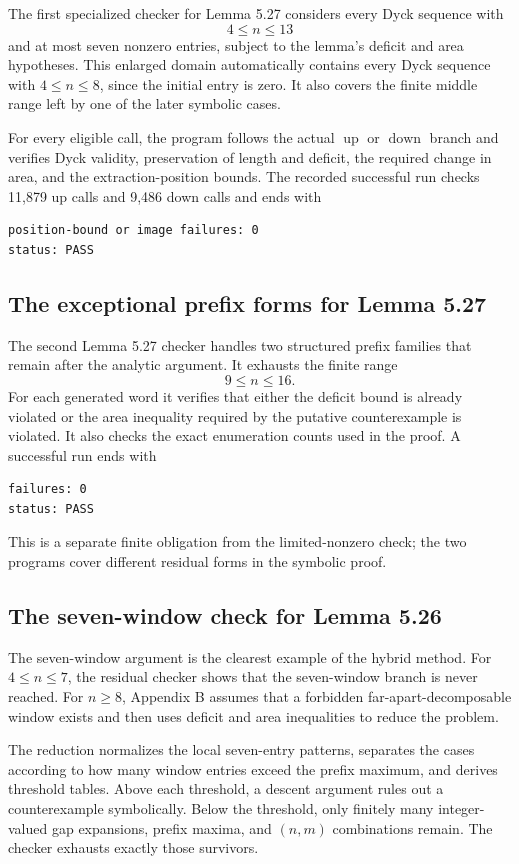 \documentclass{article}
\newcommand{\upmap}{\operatorname{up}}
\newcommand{\downmap}{\operatorname{down}}
\begin{document}
The first specialized checker for Lemma 5.27 considers every Dyck sequence
with
\[
  4\leq n\leq13
\]
and at most seven nonzero entries, subject to the lemma's deficit and area
hypotheses.  This enlarged domain automatically contains every Dyck sequence
with $4\leq n\leq8$, since the initial entry is zero.  It also covers the
finite middle range left by one of the later symbolic cases.

For every eligible call, the program follows the actual $\upmap$ or
$\downmap$ branch and verifies Dyck validity, preservation of length and
deficit, the required change in area, and the extraction-position bounds.  The
recorded successful run checks 11,879 up calls and 9,486 down calls and ends
with
\begin{verbatim}
position-bound or image failures: 0
status: PASS
\end{verbatim}

\subsection{The exceptional prefix forms for Lemma 5.27}

The second Lemma 5.27 checker handles two structured prefix families that
remain after the analytic argument.  It exhausts the finite range
\[
  9\leq n\leq16.
\]
For each generated word it verifies that either the deficit bound is already
violated or the area inequality required by the putative counterexample is
violated.  It also checks the exact enumeration counts used in the proof.  A
successful run ends with
\begin{verbatim}
failures: 0
status: PASS
\end{verbatim}
This is a separate finite obligation from the limited-nonzero check; the two
programs cover different residual forms in the symbolic proof.

\subsection{The seven-window check for Lemma 5.26}

The seven-window argument is the clearest example of the hybrid method.  For
$4\leq n\leq7$, the residual checker shows that the seven-window branch is
never reached.  For $n\geq8$, Appendix B assumes that a forbidden
far-apart-decomposable window exists and then uses deficit and area inequalities
to reduce the problem.

The reduction normalizes the local seven-entry patterns, separates the cases
according to how many window entries exceed the prefix maximum, and derives
threshold tables.  Above each threshold, a descent argument rules out a
counterexample symbolically.  Below the threshold, only finitely many
integer-valued gap expansions, prefix maxima, and $(n,m)$ combinations remain.
The checker exhausts exactly those survivors.
\end{document}
